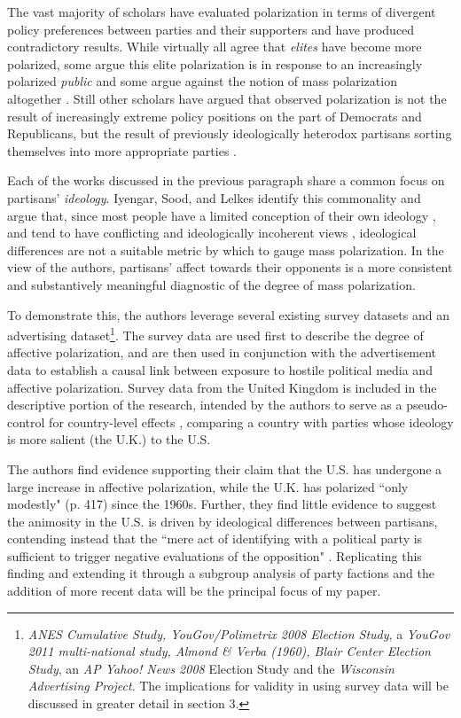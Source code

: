 \documentclass[12pt]{article}
\begin{document}
The vast majority of scholars have evaluated polarization in terms of divergent policy preferences between parties and their supporters and have produced contradictory results. While virtually all agree that \textit{elites} have become more polarized, some argue this elite polarization is in response to an increasingly polarized \textit{public} \citep{abramowitz2010disappearing} and some argue against the notion of mass polarization altogether \citep{fiorina2012disconnect, fiorina2005culture}. Still other scholars have argued that observed polarization is not the result of increasingly extreme policy positions on the part of Democrats and Republicans, but the result of previously ideologically heterodox partisans sorting themselves into more appropriate parties \citep{levendusky2009partisan}.

Each of the works discussed in the previous paragraph share a common focus on partisans' \textit{ideology}. Iyengar, Sood, and Lelkes identify this commonality and argue that, since most people have a limited conception of their own ideology \citep{converse1964nature}, and tend to have conflicting \citep{mcclosky1984american} and ideologically incoherent views \citep[p. 76--96]{zaller1992nature}, ideological differences are not a suitable metric by which to gauge mass polarization. In the view of the authors, partisans' affect towards their opponents is a more consistent and substantively meaningful diagnostic of the degree of mass polarization.

To demonstrate this, the authors leverage several existing survey datasets and an advertising dataset\footnote{\textit{ANES Cumulative Study, YouGov/Polimetrix 2008 Election Study}, a \textit{YouGov 2011 multi-national study, Almond \& Verba (1960), Blair Center Election Study}, an \textit{AP Yahoo! News 2008} Election Study and the \textit{Wisconsin Advertising Project}. The implications for validity in using survey data will be discussed in greater detail in section 3.}. The survey data are used first to describe the degree of affective polarization, and are then used in conjunction with the advertisement data to establish a causal link between exposure to hostile political media and affective polarization. Survey data from the United Kingdom is included in the descriptive portion of the research, intended by the authors to serve as a pseudo-control for country-level effects \citep[p. 407]{iyengar2012affect}, comparing a country with parties whose ideology is more salient (the U.K.) to the U.S.

The authors find evidence supporting their claim that the U.S. has undergone a large increase in affective polarization, while the U.K. has polarized ``only modestly" (p. 417) since the 1960s. Further, they find little evidence to suggest the animosity in the U.S. is driven by ideological differences between partisans, contending instead that the ``mere act of identifying with a political party is sufficient to trigger negative evaluations of the opposition" \citep[p. 407]{iyengar2012affect}. Replicating this finding and extending it through a subgroup analysis of party factions and the addition of more recent data will be the principal focus of my paper.
\end{document}
